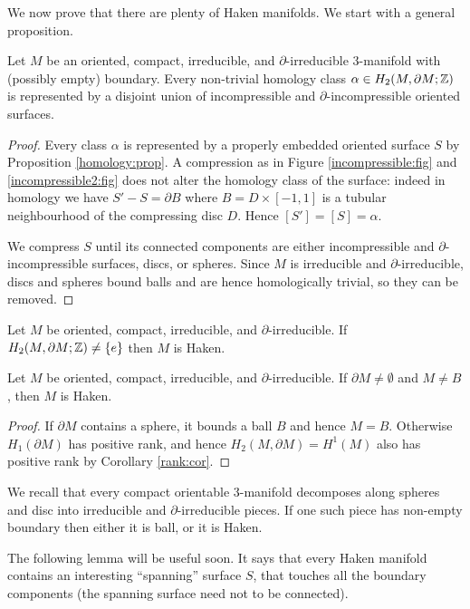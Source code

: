 We now prove that there are plenty of Haken manifolds. We start with a general proposition.

\begin{prop}
Let $M$ be an oriented, compact, irreducible, and $\partial$-irreducible 3-manifold with (possibly empty) boundary.
Every non-trivial homology class $\alpha \in H_2(M,\partial M;\mathbb{Z})$ is represented by a disjoint union of incompressible and $\partial$-incompressible oriented surfaces.
\end{prop}
\begin{proof}
Every class $\alpha$ is represented by a properly embedded oriented surface $S$ by Proposition \ref{homology:prop}. A compression as in Figure \ref{incompressible:fig} and \ref{incompressible2:fig} does not alter the homology class of the surface: indeed in homology we have $S'-S = \partial B$ where $B=D\times [-1,1]$ is a tubular neighbourhood of the compressing disc $D$. Hence $[S'] = [S] = \alpha$.

We compress $S$ until its connected components are either incompressible and $\partial$-incompressible surfaces, discs, or spheres. Since $M$ is irreducible and $\partial$-irreducible, discs and spheres bound balls and are hence homologically trivial, so they can be removed.
\end{proof}

\begin{cor} 
Let $M$ be oriented, compact, irreducible, and $\partial$-irreducible. If $H_2(M,\partial M; \mathbb{Z})\neq \{e\}$ then $M$ is Haken. 
\end{cor}
\begin{cor} \label{boundary:implies:Haken:cor}
Let $M$ be oriented, compact, irreducible, and $\partial$-irreducible. 
If $\partial M \neq \emptyset$ and $M\neq B$, then $M$ is Haken.
\end{cor}
\begin{proof}
If $\partial M$ contains a sphere, it bounds a ball $B$ and hence $M=B$. Otherwise $H_1(\partial M)$ has positive rank, and hence $H_2(M,\partial M)=H^1(M)$ also has positive rank by Corollary \ref{rank:cor}.
\end{proof}

We recall that every compact orientable 3-manifold decomposes along spheres and disc into irreducible and $\partial$-irreducible pieces. If one such piece has non-empty boundary then either it is ball, or it is Haken.

The following lemma will be useful soon. It says that every Haken manifold contains an interesting ``spanning'' surface $S$, that touches all the boundary components (the spanning surface need not to be connected).

